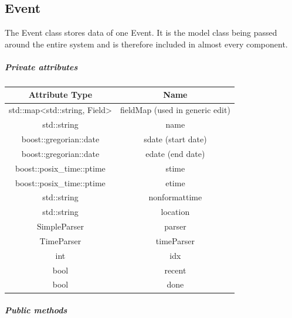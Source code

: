 \documentclass[12pt]{extarticle}
\begin{document}
\subsection{Event}
The Event class stores data of one Event. It is the model class being passed around the entire system and is therefore included in almost every component.
\subparagraph{Private attributes}
\begin{tabular}{c c}
Attribute Type & Name\\
\hline
std::map<std::string, Field> & fieldMap (used in generic edit)\\
std::string & name\\
boost::gregorian::date & sdate (start date)\\
boost::gregorian::date & edate (end date)\\
boost::posix\_time::ptime & stime\\
boost::posix\_time::ptime & etime\\
std::string & nonformattime\\
std::string & location\\
SimpleParser & parser\\
TimeParser & timeParser\\
int & idx\\
bool & recent\\
bool & done\\
\end{tabular}
\subparagraph{Public methods}
\end{document}
